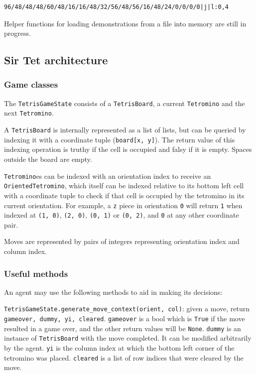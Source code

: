 \documentclass[11pt]{article}
\begin{document}
\begin{verbatim}
96/48/48/48/60/48/16/16/48/32/56/48/56/16/48/24/0/0/0/0|j|l:0,4
\end{verbatim}

Helper functions for loading demonstrations from a file into memory are
still in progress.

\hypertarget{sir-tet-architecture}{%
\subsection{Sir Tet architecture}\label{sir-tet-architecture}}

\hypertarget{game-classes}{%
\subsubsection{Game classes}\label{game-classes}}

The \texttt{TetrisGameState} consists of a \texttt{TetrisBoard}, a
current \texttt{Tetromino} and the next \texttt{Tetromino}.

A \texttt{TetrisBoard} is internally represented as a list of lists, but
can be queried by indexing it with a coordinate tuple
(\texttt{board{[}x,\ y{]}}). The return value of this indexing operation
is truthy if the cell is occupied and falsy if it is empty. Spaces
outside the board are empty.

\texttt{Tetromino}es can be indexed with an orientation index to receive
an \texttt{OrientedTetromino}, which itself can be indexed relative to
its bottom left cell with a coordinate tuple to check if that cell is
occupied by the tetromino in its current orientation. For example, a
\texttt{z} piece in orientation \texttt{0} will return \texttt{1} when
indexed at \texttt{(1,\ 0)}, \texttt{(2,\ 0)}, \texttt{(0,\ 1)} or
\texttt{(0,\ 2)}, and \texttt{0} at any other coordinate pair.

Moves are represented by pairs of integers representing orientation
index and column index.

\hypertarget{useful-methods}{%
\subsubsection{Useful methods}\label{useful-methods}}

An agent may use the following methods to aid in making its decisions:

\texttt{TetrisGameState.generate\_move\_context(orient,\ col)}: given a
move, return \texttt{gameover,\ dummy,\ yi,\ cleared}. \texttt{gameover}
is a bool which is \texttt{True} if the move resulted in a game over,
and the other return values will be \texttt{None}. \texttt{dummy} is an
instance of \texttt{TetrisBoard} with the move completed. It can be
modified arbitrarily by the agent. \texttt{yi} is the column index at
which the bottom left corner of the tetromino was placed.
\texttt{cleared} is a list of row indices that were cleared by the move.
\end{document}
